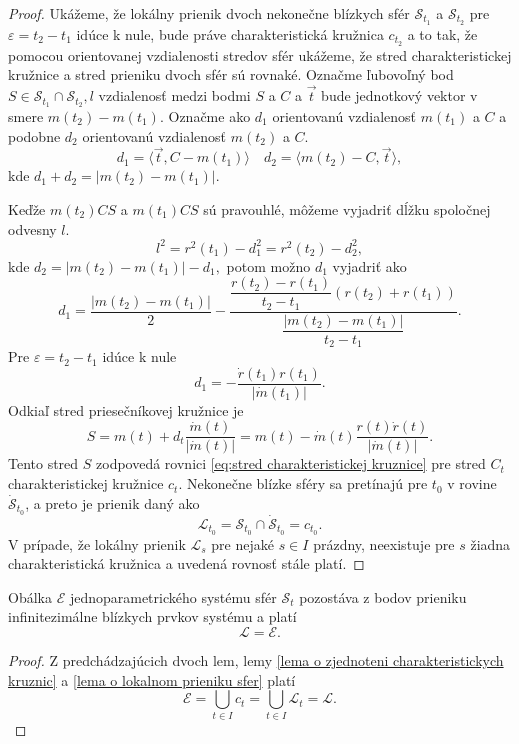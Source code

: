 \begin{proof}
Ukážeme, že lokálny prienik dvoch nekonečne blízkych sfér $\mathcal{S}_{t_1}$ a $\mathcal{S}_{t_2}$ pre $\varepsilon = t_2 - t_1$ idúce k nule, bude práve charakteristická kružnica $c_{t_2}$ a to tak, že pomocou orientovanej vzdialenosti stredov sfér ukážeme, že stred charakteristickej kružnice a stred prieniku dvoch sfér sú rovnaké.
Označme ľubovoľný bod $S \in \mathcal{S}_{t_1} \cap \mathcal{S}_{t_2}, l $ vzdialenosť medzi bodmi $S$ a $C$ a $\vec{t} $ bude jednotkový vektor v smere $ m(t_2) - m(t_1).$
Označme ako $d_1$ orientovanú vzdialenosť $m(t_1)$ a $C$ a podobne $d_2$ orientovanú vzdialenosť $m(t_2)$ a $C.$
$$ d_1 = \langle \vec{t}, C - m(t_1) \rangle \quad d_2 = \langle m(t_2) - C,  \vec{t} \rangle, $$
kde $d_1 + d_2 = | m(t_2) - m(t_1) |.$

Keďže $m(t_2)CS$ a $m(t_1)CS$ sú pravouhlé, môžeme vyjadriť dĺžku spoločnej odvesny $l.$
$$l^2 = r^2(t_1) - d^2_1 = r^2(t_2) - d^2_2,$$
kde $d_2 = |m(t_2) - m(t_1)| - d_1, $
potom možno $d_1$ vyjadriť ako 
$$d_1 = \dfrac{ | m(t_2) - m(t_1) |}{2} - \dfrac{\dfrac{r(t_2)-r(t_1)}{t_2-t_1} (r(t_2) +r(t_1))}{\dfrac{ | m(t_2)-m(t_1) |}{t_2 - t_1}}.$$
Pre $\varepsilon = t_2 - t_1 $ idúce k nule
$$ d_1 = - \dfrac{\dot{r}(t_1) r(t_1)}{| \dot{m}(t_1) |}.  $$
Odkiaľ stred priesečníkovej kružnice je
$$S = m(t) + d_t \dfrac{\dot{m}(t)}{| \dot{m}(t)|} = m(t) - \dot{m}(t)\dfrac{r(t)\dot{r}(t)}{|\dot{m}(t)|}. $$
Tento stred $S$ zodpovedá rovnici \ref{eq:stred charakteristickej kruznice} pre stred $C_t$ charakteristickej kružnice $c_t$. Nekonečne blízke sféry sa pretínajú pre $t_0$ v rovine $\mathcal{\dot{S}}_{t_0}$, a preto je prienik daný ako 
$$ \mathcal{L}_{t_0} = \mathcal{S}_{t_0} \cap \mathcal{\dot{S}}_{t_0} = c_{t_0}. $$
V prípade, že lokálny prienik $\mathcal{L}_{s}$ pre nejaké $s \in I$ prázdny, neexistuje pre $s$ žiadna charakteristická kružnica a uvedená rovnosť stále platí.
\end{proof}

\begin{theorem}
Obálka $\mathcal{E}$ jednoparametrického systému sfér $\mathcal{S}_t$ pozostáva z bodov prieniku infinitezimálne blízkych prvkov systému a platí $$
\mathcal{L} = \mathcal{E}.
$$
\end{theorem}

\begin{proof}
Z predchádzajúcich dvoch lem, lemy \ref{lema o zjednoteni charakteristickych kruznic} a \ref{lema o lokalnom prieniku sfer} platí 
$$ \mathcal{E} = \bigcup_{t \in I } c_t = \bigcup_{t \in I} \mathcal{L}_t = \mathcal{L}. $$
\end{proof}

